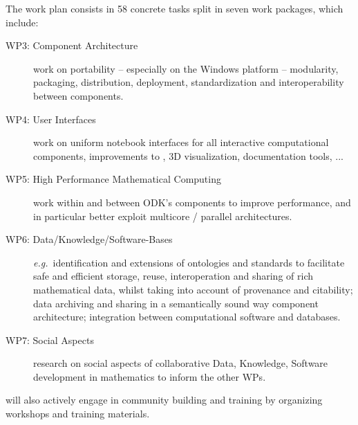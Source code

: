 The \ODK work plan consists in 58 concrete tasks split in seven work packages, which
include:
\begin{description}
\item[WP3: Component Architecture] work on portability -- especially
  on the Windows platform -- modularity, packaging, distribution,
  deployment, standardization and interoperability between components.
\item[WP4: User Interfaces] work on uniform \Jupyter notebook
  interfaces for all interactive computational components, improvements
  to \Jupyter, 3D visualization, documentation tools, ...
\item[WP5: High Performance Mathematical Computing] work within
  and between ODK's components to improve performance, and in
  particular better exploit multicore / parallel architectures.
\item[WP6: Data/Knowledge/Software-Bases] \emph{e.g.}\ identification and extensions of ontologies
  and standards to facilitate safe and efficient storage, reuse, interoperation and
  sharing of rich mathematical data, whilst taking into account of provenance and
  citability; data archiving and sharing in a semantically sound way component
  architecture; integration between computational software and databases.
\item[WP7: Social Aspects] research on social aspects of collaborative
  Data, Knowledge, Software development in mathematics to inform the
  other WPs.
\end{description}
\ODK will also actively engage in community building and training by organizing workshops
and training materials.

